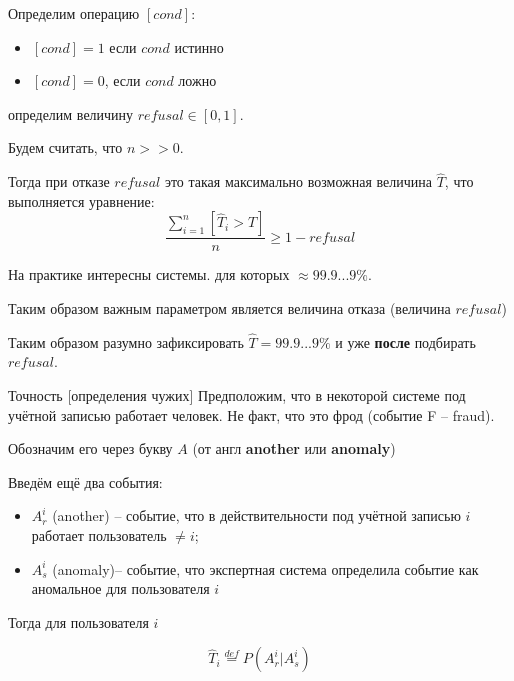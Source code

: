 \begin{frame}
	\small
	Определим операцию $[cond]$: 
	\begin{itemize}
		\item $[cond]=1$ если $cond$ истинно 
		\item $[cond]=0$, если $cond$ ложно
	\end{itemize}
	
	определим величину $refusal \in [0, 1]$.
	
	Будем считать, что $n >> 0$.
	
	Тогда  при отказе $refusal$ это такая максимально
	возможная величина $\hat T$, что выполняется уравнение:
	\begin{equation}
	\frac{\sum_{i=1}^{n}[\hat T_i > 
		\hat T]}{n} \geqslant 1 -  refusal
	\end{equation}
\end{frame}

\begin{frame}
	\Large
	На практике интересны системы. для которых 
	 $ \approx 99.9...9\%$.
	
	\begin{center}
	\end{center}
	Таким образом важным параметром является величина отказа
	(величина $refusal$)
	
	Таким образом разумно зафиксировать 
	$ \hat T = 99.9...9\%$ и уже \textbf{после}
	подбирать $refusal$.
	
\end{frame}

\begin{frame}{Точность [определения чужих]}
	\small
	Предположим, что в некоторой системе под учётной записью 
	работает  человек.
	Не факт, что это фрод (событие F -- fraud).
	
	Обозначим его через букву $A$ (от англ \textbf{another} или \textbf{anomaly})
	
	Введём ещё два события:
	\begin{itemize}
		\item $A_r^i$ (another) -- событие, что в действительности под учётной записью $i$
		работает пользователь $\neq i$;
		\item $A_s^i$ (anomaly)-- событие, что экспертная система определила событие
		как аномальное для пользователя $i$
	\end{itemize}

	Тогда 	
	для пользователя $i$	

	\begin{equation}
	\hat T_i \stackrel{def}{=} P (A_r^i | A_s^i)
	\end{equation}
	
\end{frame}


